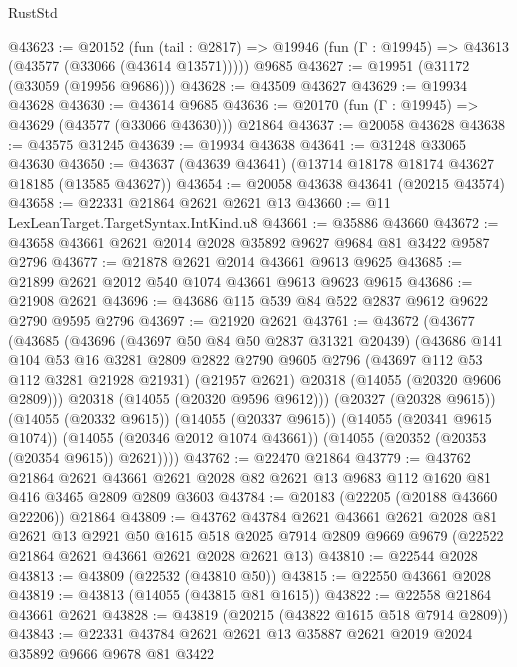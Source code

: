 \begin{lexlean}{RustStd}
\begin{coremodule}
@43623 := @20152
    (fun (tail : @2817) => @19946 (fun (Γ : @19945) => @43613 (@43577 (@33066 (@43614 @13571)))))
    @9685
@43627 := @19951 (@31172 (@33059 (@19956 @9686)))
@43628 := @43509 @43627
@43629 := @19934 @43628
@43630 := @43614 @9685
@43636 := @20170 (fun (Γ : @19945) => @43629 (@43577 (@33066 @43630))) @21864
@43637 := @20058 @43628
@43638 := @43575 @31245
@43639 := @19934 @43638
@43641 := @31248 @33065 @43630
@43650 := @43637 (@43639 @43641) (@13714 @18178 @18174 @43627 @18185 (@13585 @43627))
@43654 := @20058 @43638 @43641 (@20215 @43574)
@43658 := @22331 @21864 @2621 @2621 @13
@43660 := @11 LexLeanTarget.TargetSyntax.IntKind.u8
@43661 := @35886 @43660
@43672 := @43658 @43661 @2621 @2014 @2028 @35892 @9627 @9684 @81 @3422 @9587 @2796
@43677 := @21878 @2621 @2014 @43661 @9613 @9625
@43685 := @21899 @2621 @2012 @540 @1074 @43661 @9613 @9623 @9615
@43686 := @21908 @2621
@43696 := @43686 @115 @539 @84 @522 @2837 @9612 @9622 @2790 @9595 @2796
@43697 := @21920 @2621
@43761 := @43672
    (@43677
      (@43685
        (@43696
          (@43697 @50 @84 @50 @2837 @31321 @20439)
          (@43686
            @141
            @104
            @53
            @16
            @3281
            @2809
            @2822
            @2790
            @9605
            @2796
            (@43697 @112 @53 @112 @3281 @21928 @21931)
            (@21957 @2621)
            @20318
            (@14055 (@20320 @9606 @2809)))
          @20318
          (@14055 (@20320 @9596 @9612)))
        (@20327 (@20328 @9615))
        (@14055 (@20332 @9615))
        (@14055 (@20337 @9615))
        (@14055 (@20341 @9615 @1074))
        (@14055 (@20346 @2012 @1074 @43661))
        (@14055 (@20352 (@20353 (@20354 @9615)) @2621))))
@43762 := @22470 @21864
@43779 := @43762
    @21864
    @2621
    @43661
    @2621
    @2028
    @82
    @2621
    @13
    @9683
    @112
    @1620
    @81
    @416
    @3465
    @2809
    @2809
    @3603
@43784 := @20183 (@22205 (@20188 @43660 @22206)) @21864
@43809 := @43762
    @43784
    @2621
    @43661
    @2621
    @2028
    @81
    @2621
    @13
    @2921
    @50
    @1615
    @518
    @2025
    @7914
    @2809
    @9669
    @9679
    (@22522 @21864 @2621 @43661 @2621 @2028 @2621 @13)
@43810 := @22544 @2028
@43813 := @43809 (@22532 (@43810 @50))
@43815 := @22550 @43661 @2028
@43819 := @43813 (@14055 (@43815 @81 @1615))
@43822 := @22558 @21864 @43661 @2621
@43828 := @43819 (@20215 (@43822 @1615 @518 @7914 @2809))
@43843 := @22331
    @43784
    @2621
    @2621
    @13
    @35887
    @2621
    @2019
    @2024
    @35892
    @9666
    @9678
    @81
    @3422

\end{coremodule}
\end{lexlean}
